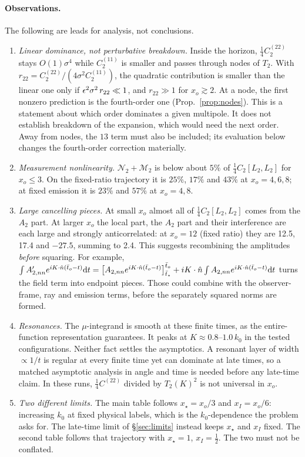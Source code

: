\paragraph{Observations.} The following are leads for analysis, not conclusions.
\begin{enumerate}
\item \emph{Linear dominance, not perturbative breakdown.} Inside the horizon,
  $\frac14C_2^{(22)}$ stays $O(1)\sigma^4$ while $C_2^{(11)}$ is smaller and passes through
  nodes of $T_2$. With $r_{22}=C_2^{(22)}/(4\sigma^2C_2^{(11)})$, the quadratic contribution is
  smaller than the linear one only if $\epsilon^2\sigma^2\,r_{22}\ll1$, and $r_{22}\gg1$ for
  $x_o\gtrsim2$. At a node, the first nonzero prediction is the fourth-order one (Prop.~\ref{prop:nodes}). This is a statement about which order
  dominates a given multipole. It does not establish breakdown of the expansion, which would
  need the next order. Away from nodes, the $13$ term must also be included; its evaluation below changes the
  fourth-order correction materially.
\item \emph{Measurement nonlinearity.} $\mathcal N_2+\mathcal M_2$ is below about $5\%$ of
  $\frac14C_2[L_2,L_2]$ for $x_o\le3$. On the fixed-ratio trajectory it is $25\%$, $17\%$ and $43\%$ at
  $x_o=4,6,8$; at fixed emission it is $23\%$ and $57\%$ at $x_o=4,8$.
\item \emph{Large cancelling pieces.} At small $x_o$ almost all of $\frac14C_2[L_2,L_2]$
  comes from the $A_2$ part. At larger $x_o$ the local part, the $A_2$ part and their
  interference are each large and strongly anticorrelated: at $x_o=12$ (fixed ratio) they
  are 12.5, 17.4 and $-27.5$, summing to 2.4. This suggests recombining
  the amplitudes \emph{before} squaring. For example,
  $\int A_{2,nn}'e^{iK\cdot\hat n(\bar t_o-t)}\mathrm{d} t=\big[A_{2,nn}e^{iK\cdot\hat n(\bar t_o-t)}\big]_{\bar t_\star}^{\bar t_o}+iK\cdot\hat n\int A_{2,nn}e^{iK\cdot\hat n(\bar t_o-t)}\mathrm{d} t$
  turns the field term into endpoint pieces. Those could combine with the observer-frame, ray
  and emission terms, before the separately squared norms are formed.
\item \emph{Resonances.} The $\mu$-integrand is smooth at these finite times, as the
  entire-function representation guarantees. It peaks at $K\approx0.8$--$1.0\,k_0$ in the
  tested configurations. Neither fact settles the asymptotics. A resonant layer of width
  $\propto1/t$ is regular at every finite time yet can dominate at late times, so a matched
  asymptotic analysis in angle and time is needed before any late-time claim. In these runs,
  $\frac14C^{(22)}$ divided by $T_2(K)^2$ is not universal in $x_o$.
\item \emph{Two different limits.} The main table follows $x_\star=x_o/3$ and
  $x_I=x_o/6$: increasing $k_0$ at fixed physical labels, which is the $k_0$-dependence the
  problem asks for. The late-time limit of \S\ref{sec:limits} instead keeps $x_\star$ and
  $x_I$ fixed. The second table follows that trajectory with $x_\star=1$, $x_I=\frac12$. The
  two must not be conflated.
\end{enumerate}
